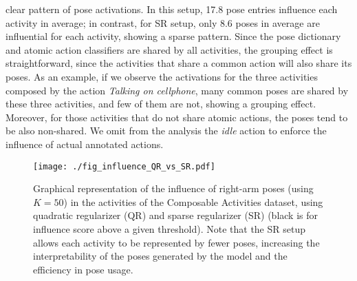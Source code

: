 clear pattern of pose activations. In this setup, 17.8 pose entries
influence each activity in average;
in contrast, for SR setup, only 8.6 poses in
average are influential for each activity, showing a sparse pattern. Since the
pose dictionary and atomic action classifiers are shared by all activities, the
grouping effect is straightforward, since the activities that share a common
action will also share its poses. As an example, if we observe the activations for the 
three activities
composed by the action \emph{Talking on cellphone}, many common poses are shared by these three
activities, and few of them are not, showing a grouping effect. Moreover, for those activities that 
do not
share atomic actions, the poses tend to be also non-shared. We omit from the
analysis the \emph{idle} action to enforce the influence of actual annotated
actions.

\begin{figure}[tb]
\begin{center}
\texttt{[image: ./fig\_influence\_QR\_vs\_SR.pdf]}
\end{center}
\caption{Graphical representation of the influence of right-arm poses (using
$K=50$) in the activities of the Composable Activities dataset, using quadratic
regularizer (QR) and sparse regularizer (SR) (black is for influence score above a given 
threshold). Note that the SR setup
allows each activity to be represented by fewer poses, increasing the
interpretability of the poses generated by the model and the efficiency in pose
usage.
}
\label{fig:influence_agg}
\end{figure}
%
